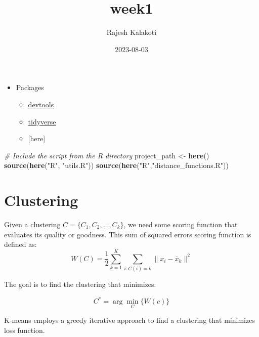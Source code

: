 \documentclass[
]{article}
\title{week1}
\author{Rajesh Kalakoti}
\date{2023-08-03}
\newenvironment{Shaded}{\begin{snugshade}}{\end{snugshade}}
\newcommand{\CommentTok}[1]{\textcolor[rgb]{0.56,0.35,0.01}{\textit{#1}}}
\newcommand{\FunctionTok}[1]{\textcolor[rgb]{0.13,0.29,0.53}{\textbf{#1}}}
\newcommand{\NormalTok}[1]{#1}
\newcommand{\OtherTok}[1]{\textcolor[rgb]{0.56,0.35,0.01}{#1}}
\newcommand{\StringTok}[1]{\textcolor[rgb]{0.31,0.60,0.02}{#1}}
\providecommand{\tightlist}{%
  \setlength{\itemsep}{0pt}\setlength{\parskip}{0pt}}
\begin{document}
\maketitle

\begin{itemize}
\tightlist
\item
  Packages

  \begin{itemize}
  \tightlist
  \item
    \href{https://www.r-project.org/nosvn/pandoc/devtools.html}{devtools}
  \item
    \href{https://www.tidyverse.org/packages/}{tidyverse}
  \item
    {[}here{]}
  \end{itemize}
\end{itemize}

\begin{Shaded}
\begin{Highlighting}[]
\CommentTok{\# Include the script from the R directory}
\NormalTok{project\_path }\OtherTok{\textless{}{-}} \FunctionTok{here}\NormalTok{()}
\FunctionTok{source}\NormalTok{(}\FunctionTok{here}\NormalTok{(}\StringTok{"R"}\NormalTok{, }\StringTok{"utils.R"}\NormalTok{))}
\FunctionTok{source}\NormalTok{(}\FunctionTok{here}\NormalTok{(}\StringTok{"R"}\NormalTok{,}\StringTok{"distance\_functions.R"}\NormalTok{))}
\end{Highlighting}
\end{Shaded}

\hypertarget{clustering}{%
\section{Clustering}\label{clustering}}

Given a clustering \(C = \{C_1, C_2, \ldots, C_k\}\), we need some
scoring function that evaluates its quality or goodness. This sum of
squared errors scoring function is defined as:
\[ W(C) = \frac{1}{2} \sum_{k=1}^{K} \sum_{i: C(i)=k} \|x_i - \bar{x}_k\|^2 \]

The goal is to find the clustering that minimizes:

\[ C^* = \arg \min_C \{ W(c) \} \]

K-means employs a greedy iterative approach to find a clustering that
minimizes loss function.
\end{document}
